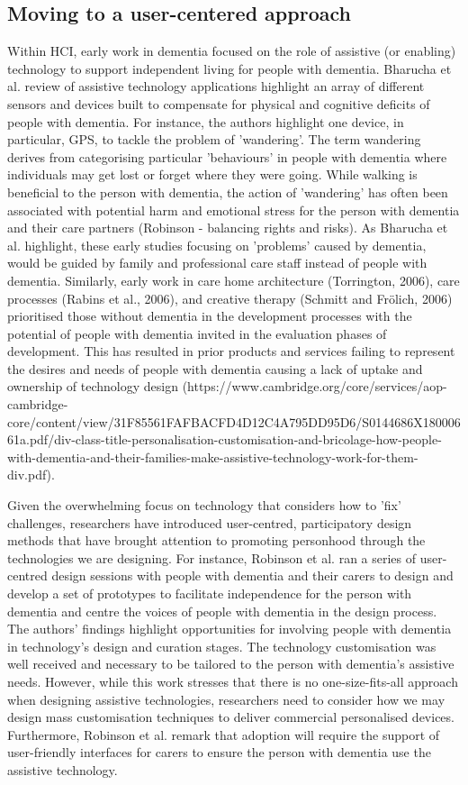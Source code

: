 \subsection{Moving to a user-centered approach}
\label{BL:Tech}
Within HCI, early work in dementia focused on the role of assistive (or enabling) technology to support independent living for people with dementia. Bharucha et al. review of assistive technology applications highlight an array of different sensors and devices built to compensate for physical and cognitive deficits of people with dementia. For instance, the authors highlight one device, in particular, GPS, to tackle the problem of 'wandering'. The term wandering derives from categorising particular 'behaviours' in people with dementia where individuals may get lost or forget where they were going. While walking is beneficial to the person with dementia, the action of 'wandering' has often been associated with potential harm and emotional stress for the person with dementia and their care partners (Robinson - balancing rights and risks). As Bharucha et al. highlight, these early studies focusing on 'problems' caused by dementia, would be guided by family and professional care staff instead of people with dementia. Similarly, early work in care home architecture (Torrington, 2006), care processes (Rabins et al., 2006), and creative therapy (Schmitt and Frölich, 2006) prioritised those without dementia in the development processes with the potential of people with dementia invited in the evaluation phases of development. This has resulted in prior products and services failing to represent the desires and needs of people with dementia causing a lack of uptake and ownership of technology design (https://www.cambridge.org/core/services/aop-cambridge-core/content/view/31F85561FAFBACFD4D12C4A795DD95D6/S0144686X18000661a.pdf/div-class-title-personalisation-customisation-and-bricolage-how-people-with-dementia-and-their-families-make-assistive-technology-work-for-them-div.pdf). 

Given the overwhelming focus on technology that considers how to 'fix' challenges, researchers have introduced user-centred, participatory design methods that have brought attention to promoting personhood through the technologies we are designing. For instance, Robinson et al. ran a series of user-centred design sessions with people with dementia and their carers to design and develop a set of prototypes to facilitate independence for the person with dementia and centre the voices of people with dementia in the design process. The authors' findings highlight opportunities for involving people with dementia in technology's design and curation stages. The technology customisation was well received and necessary to be tailored to the person with dementia's assistive needs. However, while this work stresses that there is no one-size-fits-all approach when designing assistive technologies, researchers need to consider how we may design mass customisation techniques to deliver commercial personalised devices. Furthermore, Robinson et al. remark that adoption will require the support of user-friendly interfaces for carers to ensure the person with dementia use the assistive technology. 

